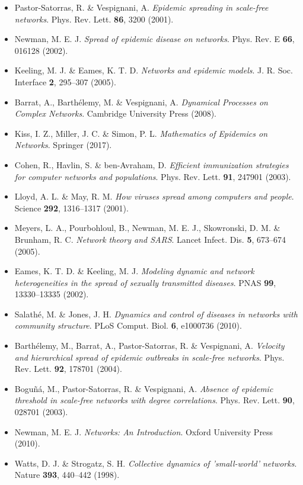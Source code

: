 \documentclass[a4paper, 11pt]{article}
\begin{document}
\begin{itemize}
\item Pastor-Satorras, R. \& Vespignani, A. \textit{Epidemic spreading in scale-free networks}. Phys. Rev. Lett. \textbf{86}, 3200 (2001).
\item Newman, M. E. J. \textit{Spread of epidemic disease on networks}. Phys. Rev. E \textbf{66}, 016128 (2002).
\item Keeling, M. J. \& Eames, K. T. D. \textit{Networks and epidemic models}. J. R. Soc. Interface \textbf{2}, 295–307 (2005).
\item Barrat, A., Barthélemy, M. \& Vespignani, A. \textit{Dynamical Processes on Complex Networks}. Cambridge University Press (2008).
\item Kiss, I. Z., Miller, J. C. \& Simon, P. L. \textit{Mathematics of Epidemics on Networks}. Springer (2017).
\item Cohen, R., Havlin, S. \& ben-Avraham, D. \textit{Efficient immunization strategies for computer networks and populations}. Phys. Rev. Lett. \textbf{91}, 247901 (2003).
\item Lloyd, A. L. \& May, R. M. \textit{How viruses spread among computers and people}. Science \textbf{292}, 1316–1317 (2001).
\item Meyers, L. A., Pourbohloul, B., Newman, M. E. J., Skowronski, D. M. \& Brunham, R. C. \textit{Network theory and SARS}. Lancet Infect. Dis. \textbf{5}, 673–674 (2005).
\item Eames, K. T. D. \& Keeling, M. J. \textit{Modeling dynamic and network heterogeneities in the spread of sexually transmitted diseases}. PNAS \textbf{99}, 13330–13335 (2002).
\item Salathé, M. \& Jones, J. H. \textit{Dynamics and control of diseases in networks with community structure}. PLoS Comput. Biol. \textbf{6}, e1000736 (2010).
\item Barthélemy, M., Barrat, A., Pastor-Satorras, R. \& Vespignani, A. \textit{Velocity and hierarchical spread of epidemic outbreaks in scale-free networks}. Phys. Rev. Lett. \textbf{92}, 178701 (2004).
\item Boguñá, M., Pastor-Satorras, R. \& Vespignani, A. \textit{Absence of epidemic threshold in scale-free networks with degree correlations}. Phys. Rev. Lett. \textbf{90}, 028701 (2003).
\item Newman, M. E. J. \textit{Networks: An Introduction}. Oxford University Press (2010).
\item Watts, D. J. \& Strogatz, S. H. \textit{Collective dynamics of 'small-world' networks}. Nature \textbf{393}, 440–442 (1998).

\end{itemize}
\end{document}

